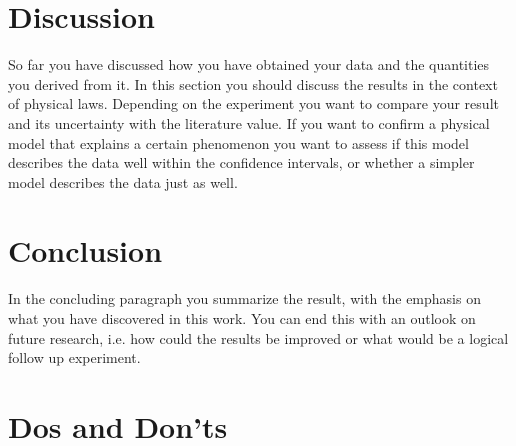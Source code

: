 \documentclass[12pt,a4paper]{article}
\begin{document}
\section{Discussion}

So far you have discussed how you have obtained your data and the
quantities you derived from it. In this section you should discuss
the results in the context of physical laws. Depending on the
experiment you want to compare your result and its uncertainty with
the literature value. If you want to confirm a physical model that
explains a certain phenomenon you want to assess if this model
describes the data well within the confidence intervals, or whether
a simpler model describes the data just as well.

\section{Conclusion}

In the concluding paragraph you summarize the result, with the
emphasis on what you have discovered in this work. You can end this
with an outlook on future research, i.e. how could the results be
improved or what would be a logical follow up experiment.

\newpage

\section{Dos and Don'ts}
\end{document}
